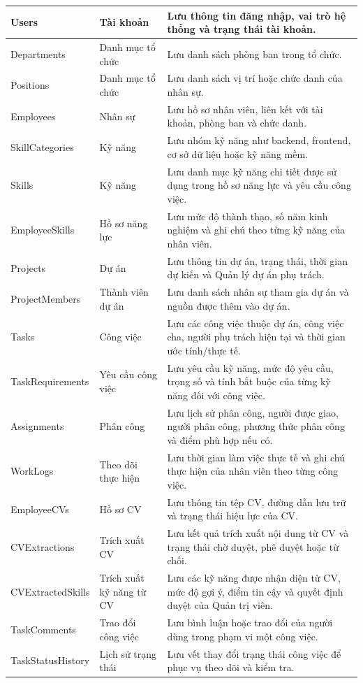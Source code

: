 \documentclass[../DoAn.tex]{subfiles}
\begin{document}
\begin{longtable}{|>{\raggedright\arraybackslash}p{}|>{\raggedright\arraybackslash}p{}|>{\raggedright\arraybackslash}p{}|}
    Users & Tài khoản & Lưu thông tin đăng nhập, vai trò hệ thống và trạng thái tài khoản. \\ \hline
    Departments & Danh mục tổ chức & Lưu danh sách phòng ban trong tổ chức. \\ \hline
    Positions & Danh mục tổ chức & Lưu danh sách vị trí hoặc chức danh của nhân sự. \\ \hline
    Employees & Nhân sự & Lưu hồ sơ nhân viên, liên kết với tài khoản, phòng ban và chức danh. \\ \hline
    SkillCategories & Kỹ năng & Lưu nhóm kỹ năng như backend, frontend, cơ sở dữ liệu hoặc kỹ năng mềm. \\ \hline
    Skills & Kỹ năng & Lưu danh mục kỹ năng chi tiết được sử dụng trong hồ sơ năng lực và yêu cầu công việc. \\ \hline
    EmployeeSkills & Hồ sơ năng lực & Lưu mức độ thành thạo, số năm kinh nghiệm và ghi chú theo từng kỹ năng của nhân viên. \\ \hline
    Projects & Dự án & Lưu thông tin dự án, trạng thái, thời gian dự kiến và Quản lý dự án phụ trách. \\ \hline
    ProjectMembers & Thành viên dự án & Lưu danh sách nhân sự tham gia dự án và nguồn được thêm vào dự án. \\ \hline
    Tasks & Công việc & Lưu các công việc thuộc dự án, công việc cha, người phụ trách hiện tại và thời gian ước tính/thực tế. \\ \hline
    TaskRequirements & Yêu cầu công việc & Lưu yêu cầu kỹ năng, mức độ yêu cầu, trọng số và tính bắt buộc của từng kỹ năng đối với công việc. \\ \hline
    Assignments & Phân công & Lưu lịch sử phân công, người được giao, người phân công, phương thức phân công và điểm phù hợp nếu có. \\ \hline
    WorkLogs & Theo dõi thực hiện & Lưu thời gian làm việc thực tế và ghi chú thực hiện của nhân viên theo từng công việc. \\ \hline
    EmployeeCVs & Hồ sơ CV & Lưu thông tin tệp CV, đường dẫn lưu trữ và trạng thái hiệu lực của CV. \\ \hline
    CVExtractions & Trích xuất CV & Lưu kết quả trích xuất nội dung từ CV và trạng thái chờ duyệt, phê duyệt hoặc từ chối. \\ \hline
    CVExtractedSkills & Trích xuất kỹ năng từ CV & Lưu các kỹ năng được nhận diện từ CV, mức độ gợi ý, điểm tin cậy và quyết định duyệt của Quản trị viên. \\ \hline
    TaskComments & Trao đổi công việc & Lưu bình luận hoặc trao đổi của người dùng trong phạm vi một công việc. \\ \hline
    TaskStatusHistory & Lịch sử trạng thái & Lưu vết thay đổi trạng thái công việc để phục vụ theo dõi và kiểm tra. \\
\end{longtable}
\end{document}
